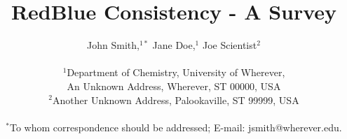 \documentclass[12pt]{article}
\title{RedBlue Consistency - A Survey}
\author
{John Smith,$^{1\ast}$ Jane Doe,$^{1}$ Joe Scientist$^{2}$\\
\\
\normalsize{$^{1}$Department of Chemistry, University of Wherever,}\\
\normalsize{An Unknown Address, Wherever, ST 00000, USA}\\
\normalsize{$^{2}$Another Unknown Address, Palookaville, ST 99999, USA}\\
\\
\normalsize{$^\ast$To whom correspondence should be addressed; E-mail:  jsmith@wherever.edu.}
}
\date{}
\theoremstyle{plain}
\theoremstyle{definition}
\theoremstyle{remark}
\newenvironment{sciabstract}{njnjnjnjn}
\begin{document}
 


\baselineskip24pt


\maketitle 




\begin{sciabstract}
  This document presents a number of hints about how to set up your
  {\it Science\/} paper in \LaTeX\ .  We provide a template file,
  \texttt{scifile.tex}, that you can use to set up the \LaTeX\ source
  for your article.  An example of the style is the special
  \texttt{\{sciabstract\}} environment used to set up the abstract you
  see here.
\end{sciabstract}




\section*{Introduction}
As the user base of the internet is increasing, providing good quality of user experience is becoming a challenging task. To deal with this,various service providers are replicating their system states across various geographically diverse sites and when an user accesses the service, it is directed to the closest or the least loaded site. Such applications are now very common. Most of the leading companies like Google,Amazon and EBay - all claim that a slight increase in user-perceived latency translates into concrete revenue loss. So to provide better availability and disaster tolerance, applications replicated user data replicated across various sites. When an user accesses the service, it is forwarded to the closest or the least loades site.
\end{document}
